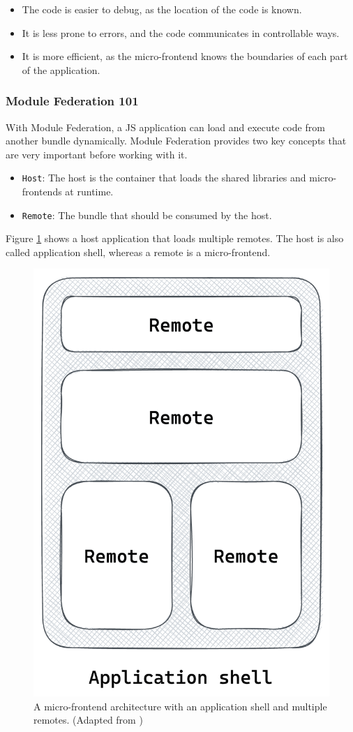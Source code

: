 \begin{itemize}
  \item The code is easier to debug, as the location of the code is known.
  \item It is less prone to errors, and the code communicates in controllable ways.
  \item It is more efficient, as the micro-frontend knows the boundaries of each part of the application.
\end{itemize}

\subsubsection{Module Federation 101}\label{subsubsection:background:micro-frontend:module-federation:101}

With Module Federation, a \ac{JS} application can load and execute code from another bundle dynamically. Module Federation provides two key concepts that are very important before working with it. \cite[118-119]{book:2021:mezzalira:applied-methods:building-micro-frontends}

\begin{itemize}
  \item \texttt{Host}: The host is the container that loads the shared libraries and micro-frontends at runtime.
  \item \texttt{Remote}: The bundle that should be consumed by the host.
\end{itemize}

\noindent Figure \ref{fig:background:micro-frontend:module-federation:module-federation-architecture} shows a host application that loads multiple remotes. The host is also called application shell, whereas a remote is a micro-frontend.

\ifshowImages
\begin{figure}[H]
  \centering
  \includegraphics[width=0.25\linewidth]{images/background/micro-frontends/module-federation/module-federation-architecture.png}
  \caption{A micro-frontend architecture with an application shell and multiple remotes. (Adapted from \cite[119]{book:2021:mezzalira:applied-methods:building-micro-frontends})}\label{fig:background:micro-frontend:module-federation:module-federation-architecture}
\end{figure}
\fi

